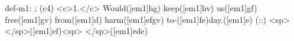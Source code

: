 def-m1: \grealign;
(c4) <c>1.</c> Would([em1]hg) keep([em1]hv) us([em1]gf) free([em1]gv) from([em1]d) harm([em1]efgv) to-([em1]fe)day.([em1]e) (::) <sp> </sp>([em1]ef)<sp>   </sp>([em1]ede)